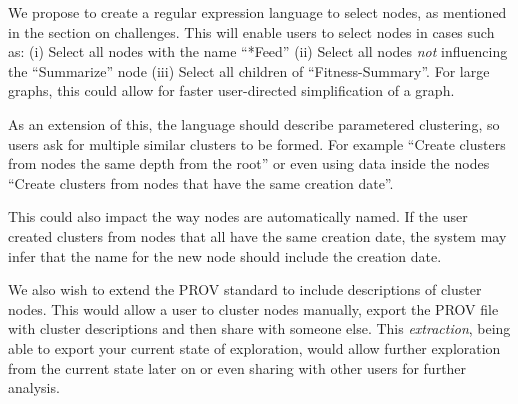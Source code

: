 We propose to create a regular expression language to select nodes, as mentioned in the section on challenges. 
This will enable users to select nodes in cases such as:
(i) Select all nodes with the name ``*Feed''
(ii) Select all nodes \textit{not} influencing the ``Summarize'' node
(iii) Select all children of ``Fitness-Summary''.
For large graphs, this could allow for faster user-directed simplification of a graph. 

As an extension of this, the language should describe parametered clustering, so users ask for multiple similar clusters to be formed. For example ``Create clusters from nodes the same depth from the root'' or even using data inside the nodes ``Create clusters from nodes that have the same creation date''.  

This could also impact the way nodes are automatically named. If the user created clusters from nodes that all have the same creation date, the system may infer that the name for the new node should include the creation date.

We also wish to extend the PROV standard to include descriptions of cluster nodes. This would allow a user to cluster nodes manually, export the PROV file with cluster descriptions and then share with someone else. This \textit{extraction}, being able to export your current state of exploration, would allow further exploration from the current state later on or even sharing with other users for further analysis.


% 
% 
% 
